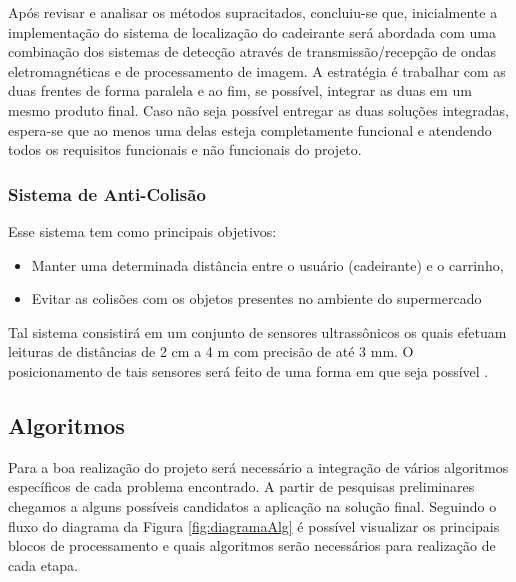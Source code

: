 \par Após revisar e analisar os métodos supracitados, concluiu-se que, inicialmente a implementação do sistema de localização do cadeirante será abordada com uma combinação dos sistemas de detecção através de transmissão/recepção de ondas eletromagnéticas e de processamento de imagem. A estratégia é trabalhar com as duas frentes de forma paralela e ao fim, se possível, integrar as duas em um mesmo produto final. Caso não seja possível entregar as duas soluções integradas, espera-se que ao menos uma delas esteja completamente funcional e atendendo todos os requisitos funcionais e não funcionais do projeto. 

\subsubsection{Sistema de Anti-Colisão}
\par Esse sistema tem como principais objetivos:

\begin{itemize}
\item Manter uma determinada distância entre o usuário (cadeirante) e o carrinho,
\item Evitar as colisões com os objetos presentes no ambiente do supermercado
\end{itemize}

\par Tal sistema consistirá em um conjunto de sensores ultrassônicos os quais efetuam leituras de distâncias de 2 cm a 4 m com precisão de até 3 mm. O posicionamento de tais sensores será feito de uma forma em que seja possível  \cite{flipeflop}.

\subsection{Algoritmos}

\par Para a boa realização do projeto será necessário a integração de vários algoritmos específicos de cada problema encontrado. A partir de pesquisas preliminares chegamos a alguns possíveis candidatos a aplicação na solução final. Seguindo o fluxo do diagrama da Figura \ref{fig:diagramaAlg} é possível visualizar os principais blocos de processamento e quais algoritmos serão necessários para realização de cada etapa.

